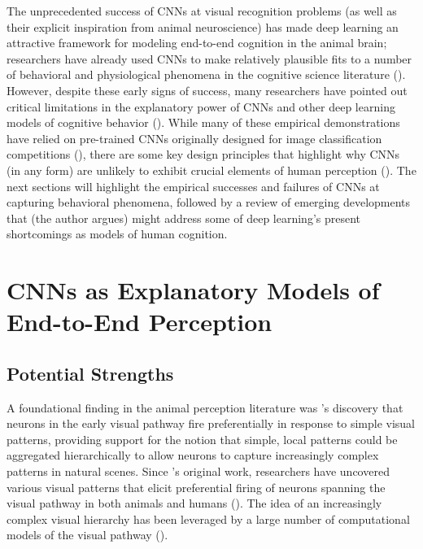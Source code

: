 \documentclass[12pt]{article}
\let\oldcite=\cite
\let\oldtextcite=\textcite
\renewcommand{\cite}[1]{\textcolor[rgb]{0, .121, .388}{\oldcite{#1}}}
\renewcommand{\textcite}[1]{\textcolor[rgb]{0, .121, .388}{\oldtextcite{#1}}}
\begin{document}
The unprecedented success of CNNs at visual recognition problems (as well as their explicit inspiration from animal neuroscience) has made deep learning an attractive framework for modeling end-to-end cognition in the animal brain; researchers have already used CNNs to make relatively plausible fits to a number of behavioral and physiological phenomena in the cognitive science literature (\cite{yamins2016using,storrs2019deep}). However, despite these early signs of success, many researchers have pointed out critical limitations in the explanatory power of CNNs and other deep learning models of cognitive behavior (\cite{serre2007feedforward,lake2017building,serre2019deep}). While many of these empirical demonstrations have relied on pre-trained CNNs originally designed for image classification competitions (\cite{simonyan2014very,krizhevsky2012imagenet,szegedy2015going}), there are some key design principles that highlight why CNNs (in any form) are unlikely to exhibit crucial elements of human perception (\cite{gulccehre2016knowledge}). The next sections will highlight the empirical successes and failures of CNNs at capturing behavioral phenomena, followed by a review of emerging developments that (the author argues) might address some of deep learning's present shortcomings as models of human cognition. 




\section{CNNs as Explanatory Models of End-to-End Perception}

\subsection{Potential Strengths}

A foundational finding in the animal perception literature was \textcite{hubel1962receptive}'s discovery that neurons in the early visual pathway fire preferentially in response to simple visual patterns, providing support for the notion that simple, local patterns could be aggregated hierarchically to allow neurons to capture increasingly complex patterns in natural scenes. Since \textcite{hubel1962receptive}'s original work, researchers have uncovered various visual patterns that elicit preferential firing of neurons spanning the visual pathway in both animals and humans (\cite{spillmann1987comparison,Alonso2009}). The idea of an increasingly complex visual hierarchy has been leveraged by a large number of computational models of the visual pathway (\cite{poggio2013models,fukushima1983neocognitron,lecun2015deep}). 
\end{document}
